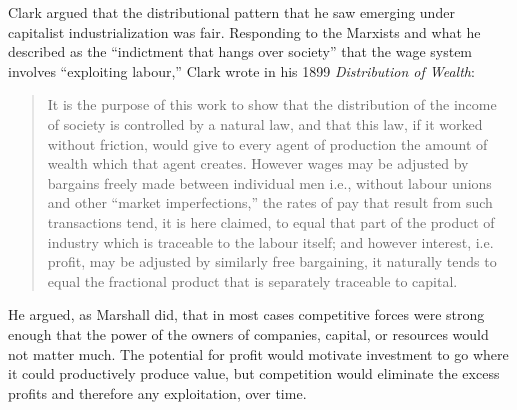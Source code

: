 Clark  argued that the distributional pattern that he saw emerging under capitalist industrialization was fair. Responding to the Marxists and what he described as the ``indictment that hangs over society'' that the wage system involves ``exploiting labour,'' Clark wrote in his 1899 \textit{Distribution of Wealth}:
\begin{quotation}
It is the purpose of this work to show that the distribution of the income of society is controlled by a natural law, and that this law, if it worked without friction, would give to every agent of production the amount of wealth which that agent creates. However wages may be adjusted by bargains freely made between individual men i.e., without labour unions and other ``market imperfections,'' the rates of pay that result from such transactions tend, it is here claimed, to equal that part of the product of industry which is traceable to the labour itself; and however interest, i.e. profit, may be adjusted by similarly free bargaining, it naturally tends to equal the fractional product that is separately traceable to capital.
\end{quotation}
He argued, as Marshall did, that in most cases competitive forces were strong enough that the power of the owners of companies, capital, or resources would not matter much. The potential for profit would motivate investment to go where it could productively produce value, but competition would eliminate the excess profits and therefore any exploitation,  over time. 

